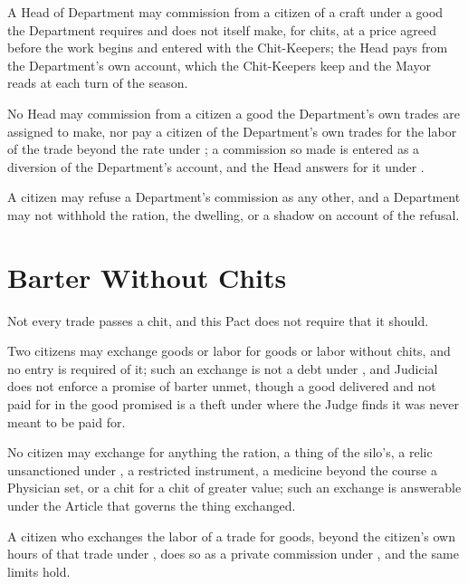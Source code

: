 \begin{clauses}
\item A Head of Department may commission from a citizen of a craft under  a good the Department requires and does not itself make, for chits, at a price agreed before the work begins and entered with the Chit-Keepers; the Head pays from the Department's own account, which the Chit-Keepers keep and the Mayor reads at each turn of the season.
\item No Head may commission from a citizen a good the Department's own trades are assigned to make, nor pay a citizen of the Department's own trades for the labor of the trade beyond the rate under ; a commission so made is entered as a diversion of the Department's account, and the Head answers for it under .
\item A citizen may refuse a Department's commission as any other, and a Department may not withhold the ration, the dwelling, or a shadow on account of the refusal.
\end{clauses}

\section{Barter Without Chits}
\label{sec:commerce:barter-without-chits}

Not every trade passes a chit, and this Pact does not require that it should.

\begin{clauses}
\item Two citizens may exchange goods or labor for goods or labor without chits, and no entry is required of it; such an exchange is not a debt under , and Judicial does not enforce a promise of barter unmet, though a good delivered and not paid for in the good promised is a theft under  where the Judge finds it was never meant to be paid for.
\item No citizen may exchange for anything the ration, a thing of the silo's, a relic unsanctioned under , a restricted instrument, a medicine beyond the course a Physician set, or a chit for a chit of greater value; such an exchange is answerable under the Article that governs the thing exchanged.
\item A citizen who exchanges the labor of a trade for goods, beyond the citizen's own hours of that trade under , does so as a private commission under , and the same limits hold.
\end{clauses}
